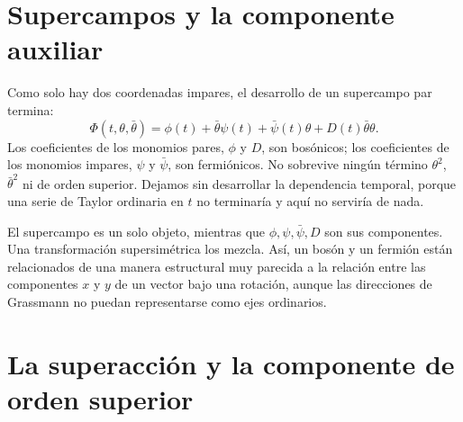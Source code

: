 \section{Supercampos y la componente auxiliar}

Como solo hay dos coordenadas impares, el desarrollo de un supercampo par termina:
\begin{equation}
\Phi(t,\theta,\bar\theta)
=\phi(t)+\bar\theta\psi(t)+\bar\psi(t)\theta
+D(t)\bar\theta\theta.
\label{eq:l7-superfield}
\end{equation}
Los coeficientes de los monomios pares, \(\phi\) y \(D\), son bosónicos; los coeficientes de los monomios impares, \(\psi\) y \(\bar\psi\), son fermiónicos. No sobrevive ningún término \(\theta^2\), \(\bar\theta^2\) ni de orden superior. Dejamos sin desarrollar la dependencia temporal, porque una serie de Taylor ordinaria en \(t\) no terminaría y aquí no serviría de nada.

\begin{classroomqa}
\end{classroomqa}

El supercampo es un solo objeto, mientras que \(\phi,\psi,\bar\psi,D\) son sus componentes. Una transformación supersimétrica los mezcla. Así, un bosón y un fermión están relacionados de una manera estructural muy parecida a la relación entre las componentes \(x\) y \(y\) de un vector bajo una rotación, aunque las direcciones de Grassmann no puedan representarse como ejes ordinarios.

\section{La superacción y la componente de orden superior}

